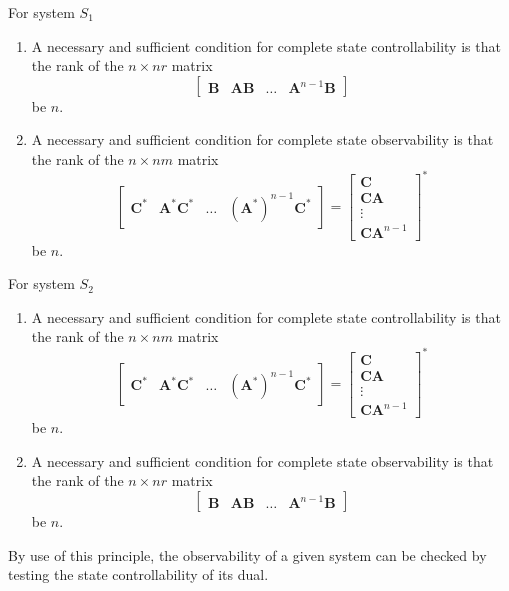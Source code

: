 \documentclass[12pt,a4paper,oneside]{book}
\begin{document}
\begin{onehalfspace}
\noindent For system $S_1$
\begin{enumerate}[label=\textbf{\arabic*}]
	\item A necessary and sufficient condition for complete state 
	controllability is that the rank of the $n 	\times nr$ matrix 
	$$
	\begin{bmatrix}
		\mathbf{B} & \mathbf{AB} & \dots & \mathbf{A}^{n-1}\mathbf{B}
	\end{bmatrix}
	$$
	be $n$.
	\item A necessary and sufficient condition for complete state observability is that the rank of the $n 	\times nm$ matrix 
	$$
	\begin{bmatrix}
		\mathbf{C}^* & \mathbf{A}^*\mathbf{C}^* & \dots & (\mathbf{A}^*)^{n-1}\mathbf{C}^*
	\end{bmatrix} = 
	\begin{bmatrix}
		\mathbf{C}  \\
		\mathbf{CA} \\
		\vdots \\
		\mathbf{CA}^{n-1}
	\end{bmatrix}^*
	$$
	be $n$.
\end{enumerate}

\noindent For system $S_2$
\begin{enumerate}[label=\textbf{\arabic*}]
	\item A necessary and sufficient condition for complete state 
	controllability is that the rank of the $n 	\times nm$ matrix 
	$$
	\begin{bmatrix}
		\mathbf{C}^* & \mathbf{A}^*\mathbf{C}^* & \dots & (\mathbf{A}^*)^{n-1}\mathbf{C}^*
	\end{bmatrix}= 
	\begin{bmatrix}
		\mathbf{C}  \\
		\mathbf{CA} \\
		\vdots \\
		\mathbf{CA}^{n-1}
	\end{bmatrix}^*
	$$
	be $n$.
	\item A necessary and sufficient condition for complete state observability 
	is that the rank of the $n 	\times nr$ matrix 
	$$
	\begin{bmatrix}
		\mathbf{B} & \mathbf{AB} & \dots & \mathbf{A}^{n-1}\mathbf{B}
	\end{bmatrix}
	$$
	be $n$.
\end{enumerate}
{By use of this principle, the observability of a given system can be checked 
by testing the state controllability of its dual.}


\end{onehalfspace}
\end{document}

